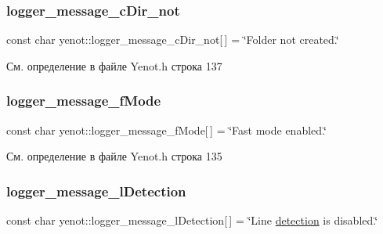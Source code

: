 \mbox{\label{namespaceyenot_a16669256cbc1918ac8500a364e0ba21d}} 
\subsubsection{\texorpdfstring{logger\+\_\+message\+\_\+c\+Dir\+\_\+not}{logger\_message\_cDir\_not}}
{\footnotesize\ttfamily const char yenot\+::logger\+\_\+message\+\_\+c\+Dir\+\_\+not\mbox{[}$\,$\mbox{]} = \char`\"{}Folder not created.\char`\"{}}



См. определение в файле Yenot.\+h строка 137

\mbox{\label{namespaceyenot_a5cb3756995a6e5a93819405ca99eb35a}} 
\subsubsection{\texorpdfstring{logger\+\_\+message\+\_\+f\+Mode}{logger\_message\_fMode}}
{\footnotesize\ttfamily const char yenot\+::logger\+\_\+message\+\_\+f\+Mode\mbox{[}$\,$\mbox{]} = \char`\"{}Fast mode enabled.\char`\"{}}



См. определение в файле Yenot.\+h строка 135

\mbox{\label{namespaceyenot_a7ba035b0bd5ec0ca88a1741671cf6818}} 
\subsubsection{\texorpdfstring{logger\+\_\+message\+\_\+l\+Detection}{logger\_message\_lDetection}}
{\footnotesize\ttfamily const char yenot\+::logger\+\_\+message\+\_\+l\+Detection\mbox{[}$\,$\mbox{]} = \char`\"{}Line \mbox{\hyperlink{_core_8h_a0ef39a5ada0921b3abf8906957746b86}{detection}} is disabled.\char`\"{}}



